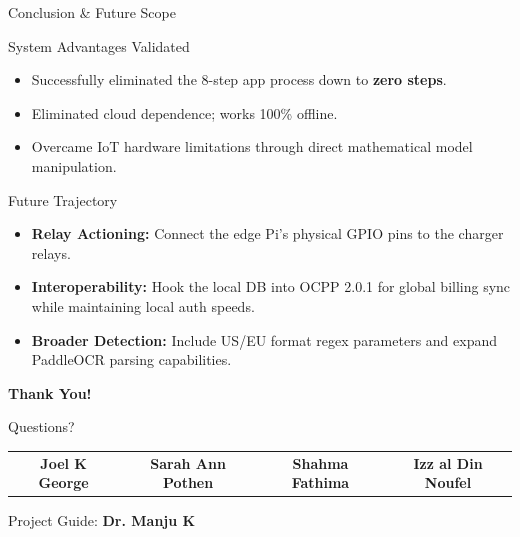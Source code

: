 \documentclass[aspectratio=169,11pt]{beamer}
\begin{document}
\begin{frame}{Conclusion \& Future Scope}
\begin{block}{System Advantages Validated}
\begin{itemize}
    \item Successfully eliminated the 8-step app process down to \textbf{zero steps}.
    \item Eliminated cloud dependence; works 100\% offline.
    \item Overcame IoT hardware limitations through direct mathematical model manipulation.
\end{itemize}
\end{block}

\begin{block}{Future Trajectory}
\begin{itemize}
    \item \textbf{Relay Actioning:} Connect the edge Pi's physical GPIO pins to the charger relays.
    \item \textbf{Interoperability:} Hook the local DB into OCPP 2.0.1 for global billing sync while maintaining local auth speeds.
    \item \textbf{Broader Detection:} Include US/EU format regex parameters and expand PaddleOCR parsing capabilities.
\end{itemize}
\end{block}
\end{frame}

\begin{frame}
\centering
\vspace{1.5cm}
{\Huge \textbf{Thank You!}}

\vspace{1cm}
{\large Questions?}

\vspace{1.5cm}
\begin{tabular}{c c c c}
\textbf{Joel K George} & \textbf{Sarah Ann Pothen} & \textbf{Shahma Fathima} & \textbf{Izz al Din Noufel}
\end{tabular}

\vspace{0.8em}
{\footnotesize Project Guide: \textbf{Dr. Manju K}}
\end{frame}
\end{document}
